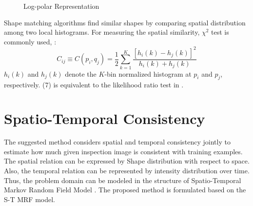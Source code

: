 \documentclass[conference]{IEEEtran}
\begin{document}
\begin{figure}[!t]
  \centering
  \label{fig:30}
  \caption{Log-polar Representation}
\end{figure}

Shape matching algorithms find similar shapes by comparing spatial distribution among two local histograms. For measuring the spatial similarity, \begin{math} \chi ^2 \end{math} test is commonly used, \cite{Belongie}:
\begin{equation}\label{eq:70}
  C_{ij} \equiv C( p_i, q_j ) = \frac{1}{2} \sum_{k=1}^K 
                              \frac{[h_i(k) - h_j(k) ] ^2}{h_i(k) + h_j(k) }
\end{equation}
\begin{math} h_i(k) \end{math} and \begin{math} h_j(k) \end{math}  denote the \begin{math} K \end{math}-bin normalized histogram at \begin{math} p_i \end{math} and \begin{math} p_j \end{math}, respectively. (7) is equivalent to the likelihood ratio test in \cite{Sheikh, Bebezeth}.


\section{Spatio-Temporal Consistency}
The suggested method considers spatial and temporal consistency jointly to estimate how much given inspection image is consistent with training examples. The spatial relation can be expressed by Shape distribution with respect to space. Also, the temporal relation can be represented by intensity distribution over time. Thus, the problem domain can be modeled in the structure of Spatio-Temporal Markov Random Field Model \cite{Kamijo}. The proposed method is formulated based on the S-T MRF model.
\end{document}
